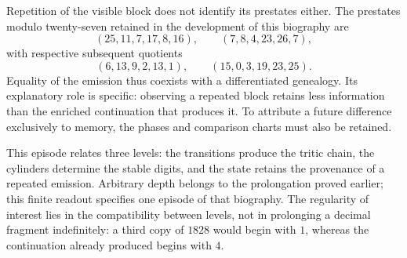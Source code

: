 Repetition of the visible block does not identify its prestates either.
The prestates modulo twenty-seven retained in the development of
this biography are
\[
 (25,11,7,17,8,16),\qquad (7,8,4,23,26,7),
\]
with respective subsequent quotients
\[
 (6,13,9,2,13,1),\qquad (15,0,3,19,23,25).
\]
Equality of the emission thus coexists with a differentiated genealogy.
Its explanatory role is specific: observing a repeated
block retains less information than the enriched continuation
that produces it. To attribute a future difference exclusively
to memory, the phases and comparison charts must also
be retained.

This episode relates three levels: the transitions produce the
tritic chain, the cylinders determine the stable digits, and the
state retains the provenance of a repeated emission. Arbitrary
depth belongs to the prolongation proved
earlier; this finite readout specifies one episode of that
biography. The regularity of interest lies in the
compatibility between levels, not in prolonging a decimal fragment
indefinitely: a third copy of \(1828\) would begin with
\(1\), whereas the continuation already produced begins with \(4\).
